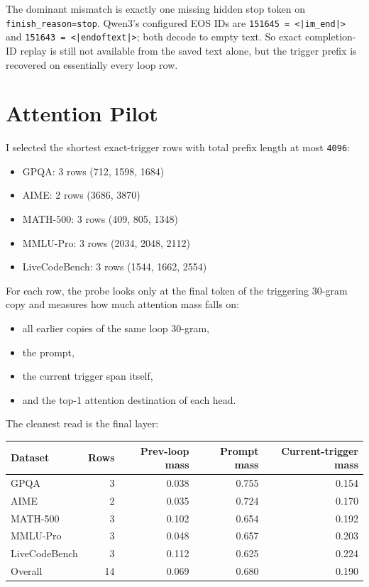 \documentclass[11pt]{article}
\begin{document}
The dominant mismatch is exactly one missing hidden stop token on \texttt{finish\_reason=stop}. Qwen3's configured EOS IDs are \texttt{151645 = <|im\_end|>} and \texttt{151643 = <|endoftext|>}; both decode to empty text. So exact completion-ID replay is still not available from the saved text alone, but the trigger prefix is recovered on essentially every loop row.

\section*{Attention Pilot}

I selected the shortest exact-trigger rows with total prefix length at most \texttt{4096}:

\begin{itemize}
  \item GPQA: 3 rows (712, 1598, 1684)
  \item AIME: 2 rows (3686, 3870)
  \item MATH-500: 3 rows (409, 805, 1348)
  \item MMLU-Pro: 3 rows (2034, 2048, 2112)
  \item LiveCodeBench: 3 rows (1544, 1662, 2554)
\end{itemize}

For each row, the probe looks only at the final token of the triggering $30$-gram copy and measures how much attention mass falls on:

\begin{itemize}
  \item all earlier copies of the same loop $30$-gram,
  \item the prompt,
  \item the current trigger span itself,
  \item and the top-1 attention destination of each head.
\end{itemize}

The cleanest read is the final layer:

\begin{center}
\begin{tabular}{lrrrr}
\toprule
Dataset & Rows & Prev-loop mass & Prompt mass & Current-trigger mass \\
\midrule
GPQA & 3 & 0.038 & 0.755 & 0.154 \\
AIME & 2 & 0.035 & 0.724 & 0.170 \\
MATH-500 & 3 & 0.102 & 0.654 & 0.192 \\
MMLU-Pro & 3 & 0.048 & 0.657 & 0.203 \\
LiveCodeBench & 3 & 0.112 & 0.625 & 0.224 \\
\midrule
Overall & 14 & 0.069 & 0.680 & 0.190 \\
\bottomrule
\end{tabular}
\end{center}
\end{document}
